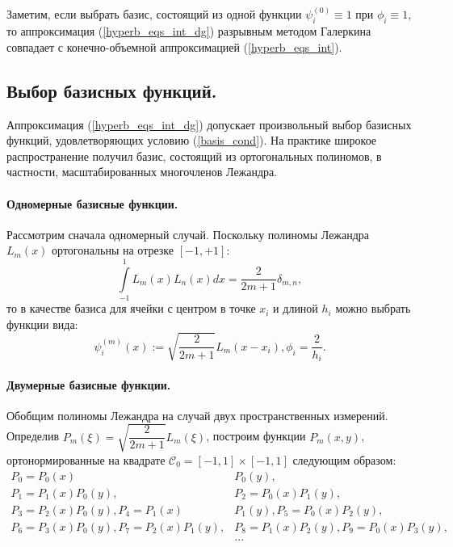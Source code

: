\documentclass[14pt, a4paper, fleqn]{extreport}
\begin{document}
	Заметим, если выбрать базис, 
	состоящий из одной функции $\psi_i^{(0)} \equiv 1$ при $\phi_i \equiv 1$, то
	аппроксимация (\ref{hyperb_eqs_int_dg}) разрывным методом Галеркина
	совпадает с конечно-объемной аппроксимацией (\ref{hyperb_eqs_int}).
	 
	\subsection{Выбор базисных функций.}
	
	Аппроксимация (\ref{hyperb_eqs_int_dg}) допускает
	произвольный выбор базисных функций, удовлетворяющих условию (\ref{basis_cond}).
	На практике широкое распространение получил базис, состоящий из ортогональных полиномов,
	в частности, масштабированных многочленов Лежандра.
		
	\paragraph{Одномерные базисные функции.}
	Рассмотрим сначала одномерный случай.
	Поскольку полиномы Лежандра $L_m(x)$ ортогональны на отрезке $[-1, +1]$:
	\begin{equation*}
		\int\limits_{-1}^1 L_m(x) L_n(x) dx = \dfrac{2}{2m + 1}\delta_{m,n},
	\end{equation*}
	то в качестве базиса для ячейки с центром в точке $x_i$ и длиной $h_i$ можно выбрать функции
	вида:
	\begin{equation*}
	\boxed{
		\psi_i^{(m)}(x) := \sqrt{\dfrac{2}{2m+1}} L_m(x - x_i), \phi_i = \dfrac{2}{h_i}.
	}
	\end{equation*}
	
  	\paragraph{Двумерные базисные функции.}
	Обобщим полиномы Лежандра на случай двух пространственных измерений.
	Определив $P_m(\xi) = \sqrt{\dfrac{2}{2m+1}} L_m(\xi)$, построим функции $P_m(x,y)$, 
	ортонормированные на квадрате $\mathcal{C}_0 = [-1, 1] \times [-1, 1]$ следующим образом:
	\begin{equation*}
	\begin{split}
		P_0 = P_0(x)&P_0(y), \\
		P_1 = P_1(x)P_0(y), & P_2 = P_0(x)P_1(y), \\
		P_3 = P_2(x)P_0(y), P_4 = P_1(x)&P_1(y), P_5 = P_0(x)P_2(y), \\
		P_6 = P_3(x)P_0(y), P_7 = P_2(x)P_1(y), &P_8 = P_1(x)P_2(y), P_9 = P_0(x)P_3(y), \\
		&...
	\end{split}
	\end{equation*}
	
\end{document}
